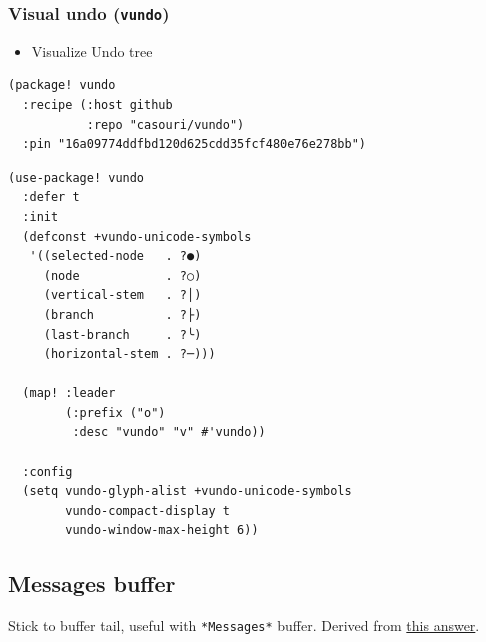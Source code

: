 \documentclass[11pt]{article}
\begin{document}
\subsubsection{Visual undo (\texttt{vundo})}
\label{sec:org1747ce7}
\begin{itemize}
\item Visualize Undo tree
\end{itemize}
\begin{verbatim}
(package! vundo
  :recipe (:host github
           :repo "casouri/vundo")
  :pin "16a09774ddfbd120d625cdd35fcf480e76e278bb")
\end{verbatim}

\begin{verbatim}
(use-package! vundo
  :defer t
  :init
  (defconst +vundo-unicode-symbols
   '((selected-node   . ?●)
     (node            . ?○)
     (vertical-stem   . ?│)
     (branch          . ?├)
     (last-branch     . ?╰)
     (horizontal-stem . ?─)))

  (map! :leader
        (:prefix ("o")
         :desc "vundo" "v" #'vundo))

  :config
  (setq vundo-glyph-alist +vundo-unicode-symbols
        vundo-compact-display t
        vundo-window-max-height 6))
\end{verbatim}

\subsection{Messages buffer}
\label{sec:org581af0a}
Stick to buffer tail, useful with \texttt{*Messages*} buffer. Derived from \href{https://stackoverflow.com/a/6341139/3058915}{this answer}.
\end{document}
